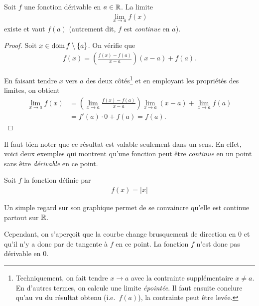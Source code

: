\documentclass[main.tex]{subfiles}
\begin{document}
\begin{proposition}

    Soit $f$ une fonction dérivable en $a \in \mathbb{R}$.
    La limite
    \begin{align}
        \lim_{x \to a} f(x)
    \end{align}
    existe et vaut $f(a)$
    (autrement dit, $f$ est \emph{continue} en $a$).
\end{proposition}
\begin{proof}
    Soit $x \in \operatorname{dom} f \setminus \{a\}$.
    On vérifie que
    \begin{align}
        f(x) = \left(\frac {f(x) - f(a)} {x - a}\right) (x - a) + f(a).
    \end{align}

    En faisant tendre $x$ vers $a$ des deux côtés\footnote{%
        Techniquement, on fait tendre $x \to a$ avec la contrainte supplémentaire $x \neq a$.
        En d'autres termes, on calcule une limite \emph{épointée}.
        Il faut ensuite conclure qu'au vu du résultat obtenu (i.e.\ $f(a)$),
        la contrainte peut être levée.
    }
    et en employant les propriétés des limites,
    on obtient
    \begin{align}
        \lim_{x \to a} f(x)
        &= \left(\lim_{x \to a} \frac {f(x) - f(a)} {x - a}\right) \lim_{x \to a} (x - a) + \lim_{x \to a} f(a)\\
        &= f'(a) \cdot 0 + f(a) = f(a).
    \end{align}
\end{proof}

Il faut bien noter que ce résultat est valable seulement dans un sens.
En effet, voici deux exemples qui montrent qu'une fonction peut être \emph{continue} en un point sans être \emph{dérivable} en ce point.

\begin{example}
    
    Soit $f$ la fonction définie par 
    \begin{align}
        f(x) = |x|
    \end{align}
    
    Un simple regard sur son graphique permet de se convaincre qu'elle est continue partout sur $\mathbb{R}$.
    \begin{plot}{0.5}{-4}{-1}{4}{4}
    \end{plot}
    
    Cependant, on s'aperçoit que la courbe change brusquement de direction en $0$ et qu'il n'y a donc par de tangente à $f$ en ce point.
    La fonction $f$ n'est donc pas dérivable en $0$.
\end{example}
\end{document}
